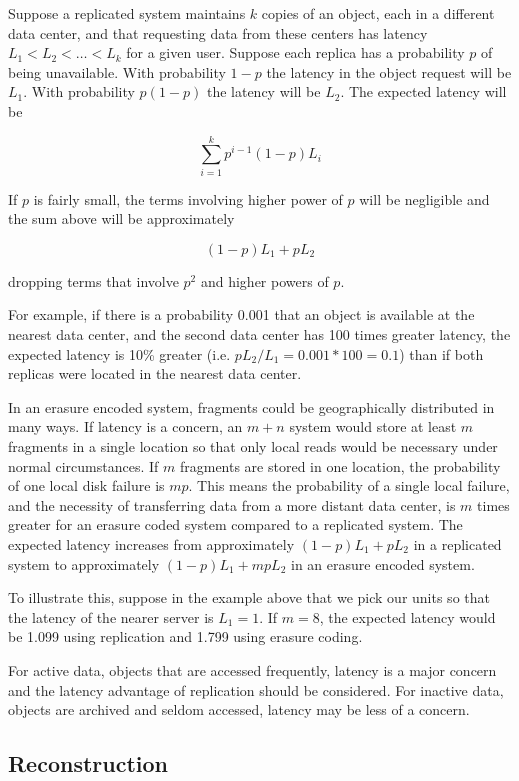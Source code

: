 \documentclass[11pt]{article}
\begin{document}
Suppose a replicated system maintains $k$ copies of an object, each in a different data center, and that requesting data from these centers has latency $L_1 < L_2 < \ldots < L_k$ for a given user. Suppose each replica has a probability $p$ of being unavailable. With probability $1-p$ the latency in the object request will be $L_1$. With probability $p(1-p)$ the latency will be $L_2$. The expected latency will be

\[ \sum_{i=1}^k p^{i-1}(1-p) L_i \]

If $p$ is fairly small, the terms involving higher power of $p$ will be negligible and the sum above will be approximately

\[ (1-p)L_1 + p L_2\]

dropping terms that involve $p^2$ and higher powers of $p$.

For example, if there is a probability 0.001 that an object is available at the nearest data center, and the second data center has 100 times greater latency, the expected latency is 10\% greater (i.e. $p L_2/L_1 = 0.001*100 = 0.1$) than if both replicas were located in the nearest data center.

In an erasure encoded system, fragments could be geographically distributed in many ways. If latency is a concern, an $m+n$ system would store at least $m$ fragments in a single location so that only local reads would be necessary under normal circumstances. If $m$ fragments are stored in one location, the probability of one local disk failure is $mp$. This means the probability of a single local failure, and the necessity of transferring data from a more distant data center, is $m$ times greater for an erasure coded system compared to a replicated system. The expected latency increases from approximately $(1-p)L_1 + pL_2$ in a replicated system to approximately $(1-p)L_1 + mpL_2$ in an erasure encoded system. 

To illustrate this, suppose in the example above that we pick our units so that the latency of the nearer server is $L_1 = 1$. If $m = 8$, the expected latency would be 
1.099 using replication and
1.799 using erasure coding. 

For active data, objects that are accessed frequently, latency is a major concern and the latency advantage of replication should be considered. For inactive data, objects are archived and seldom accessed, latency may be less of a concern.

\subsection{Reconstruction}
\end{document}
